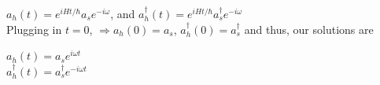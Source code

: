 \documentclass[12pt]{article}
\begin{document}
$a_h(t)=e^{iHt/\hbar}a_s e^{-i\omega}$, and $a^\dagger_h(t)=e^{iHt/\hbar}a^\dagger_s e^{-i\omega}$\\

Plugging in $t=0$, $\Rightarrow a_h(0)=a_s$, $a^\dagger_h(0)=a^\dagger_s$ and thus, our solutions are\\
\linebreak

\begin{center}
{\huge   
    $a_h(t)=a_s e^{i\omega t}$\\
    
     $a^\dagger_h(t)=a^\dagger_s e^{-i\omega t}$\\
    }
\end{center}
\end{document}
